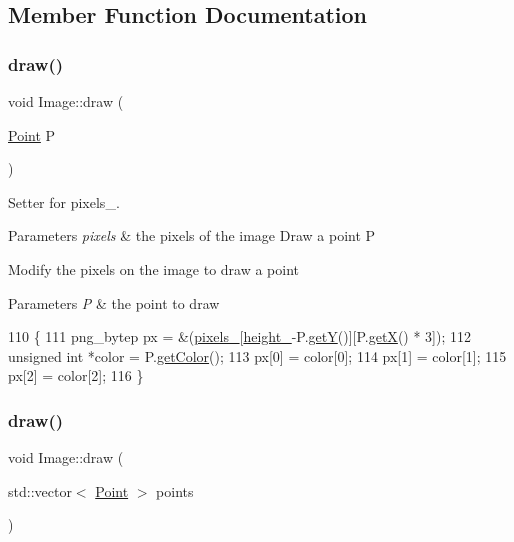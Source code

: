 \subsection{Member Function Documentation}
\mbox{\label{class_image_a8d162f3cab956131d58708c09aa560b0}} 
\subsubsection{\texorpdfstring{draw()}{draw()}\hspace{0.1cm}{\footnotesize\ttfamily [1/3]}}
{\footnotesize\ttfamily void Image\+::draw (\begin{DoxyParamCaption}\item[{\mbox{\hyperlink{class_point}{Point}}}]{P }\end{DoxyParamCaption})}



Setter for pixels\+\_\+. 


\begin{DoxyParams}{Parameters}
{\em pixels} & the pixels of the image Draw a point P\\
\hline
\end{DoxyParams}
Modify the pixels on the image to draw a point 
\begin{DoxyParams}{Parameters}
{\em P} & the point to draw \\
\hline
\end{DoxyParams}

\begin{DoxyCode}
110                         \{
111     png\_bytep px = \&(\mbox{\hyperlink{class_image_a51351c8507499d09cb9667c20ef01faf}{pixels\_}}[\mbox{\hyperlink{class_image_a64a699c5bb8e8a18c6971a8032806dba}{height\_}}-P.\mbox{\hyperlink{class_point_a86d10ff46e08462c45b15a8c7ef62d61}{getY}}()][P.\mbox{\hyperlink{class_point_ac9d5859db121c7d1b89ca89266dca0a3}{getX}}() * 3]);
112     \textcolor{keywordtype}{unsigned} \textcolor{keywordtype}{int} *color = P.\mbox{\hyperlink{class_point_a1aa902dd929328baec8c8f6970284ac2}{getColor}}();
113     px[0] = color[0];
114     px[1] = color[1];
115     px[2] = color[2];
116 \}
\end{DoxyCode}
\mbox{\label{class_image_aecc7a0365eb204dba714a71bcb86361d}} 
\subsubsection{\texorpdfstring{draw()}{draw()}\hspace{0.1cm}{\footnotesize\ttfamily [2/3]}}
{\footnotesize\ttfamily void Image\+::draw (\begin{DoxyParamCaption}\item[{std\+::vector$<$ \mbox{\hyperlink{class_point}{Point}} $>$}]{points }\end{DoxyParamCaption})}



